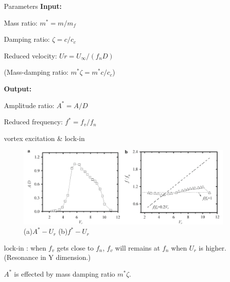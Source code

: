 \documentclass[9pt, xcolor=table]{beamer}
\begin{document}
\begin{frame}{Parameters}
	\setlength{\parindent}{2em}
	\textbf{Input:}

	\vspace{1em}

	Mass ratio: $m^{*}=m / m_{f}$

	\vspace{1em}

	Damping ratio: $\zeta=c / c_{c}$
	\vspace{1em}

	Reduced velocity: $U r=U_{\infty} /\left(f_{n} D\right)$

	\vspace{1em}

	(Mass-damping ratio: $m^{*} \zeta=m^{*} c / c_{c}$)

	\vspace{2em}

	\textbf{Output:}

	\vspace{1em}

	Amplitude ratio: $A^{*}=A / D$

	\vspace{1em}

	Reduced frequency: $f^{*}=f_{v} / f_{n}$

	\vspace{1em}
\end{frame}
%
\begin{frame}{vortex excitation \& lock-in}
	\begin{figure}
		\centering\includegraphics[height=4cm]{未标题-4.jpg}
		\caption{(a)$A^*-U_r$ (b)$f^*-U_r$}
	\end{figure}

	\setlength{\parindent}{2em}

	lock-in : when $f_v$ gets close to $f_n$, $f_v$ will remains at $f_n$ when $U_r$ is higher. (Resonance in Y dimension.)

	$A^*$ is effected by mass damping ratio $m^{*} \zeta$.
\end{frame}
%
\end{document}
